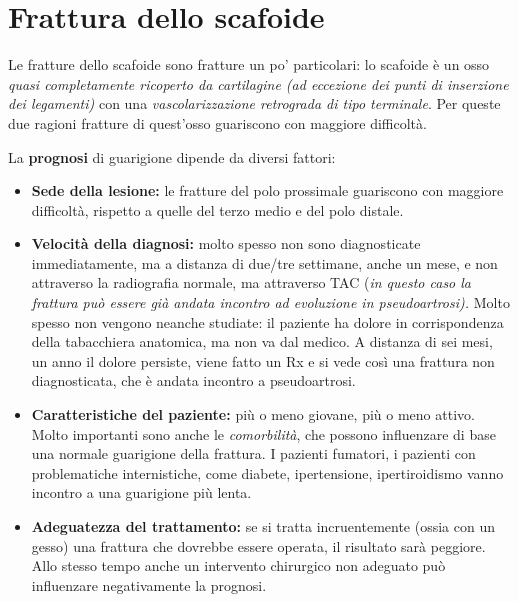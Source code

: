 \section{Frattura dello scafoide}

Le fratture dello scafoide sono fratture un po' particolari: lo scafoide è un osso \emph{quasi completamente ricoperto da cartilagine (ad eccezione dei punti di inserzione dei legamenti)} con una
\emph{vascolarizzazione retrograda di tipo terminale}. Per queste due ragioni fratture di quest'osso guariscono con maggiore difficoltà.

La \textbf{prognosi} di guarigione dipende da diversi fattori:

\begin{itemize}
\item
  \textbf{Sede della lesione:} le fratture del polo prossimale guariscono con maggiore difficoltà, rispetto a quelle del terzo medio e del polo distale.
\item
  \textbf{Velocità della diagnosi:} molto spesso non sono diagnosticate immediatamente, ma a distanza di due/tre settimane, anche un mese, e non attraverso la radiografia normale, ma attraverso TAC (\emph{in questo caso la frattura può essere già andata incontro ad evoluzione in pseudoartrosi).}
Molto spesso non vengono neanche studiate: il paziente ha dolore in corrispondenza della tabacchiera anatomica, ma non va dal medico. A
distanza di sei mesi, un anno il dolore persiste, viene fatto un Rx e si vede così una frattura non diagnosticata, che è andata incontro a pseudoartrosi.
\item
  \textbf{Caratteristiche del paziente:} più o meno giovane, più o meno attivo.
Molto importanti sono anche le \emph{comorbilità}, che possono influenzare di base una normale guarigione della frattura.
I pazienti fumatori, i pazienti con problematiche internistiche, come diabete, ipertensione, ipertiroidismo vanno incontro a una guarigione più lenta.
\item
  \textbf{Adeguatezza del trattamento:} se si tratta incruentemente (ossia con un gesso) una frattura che dovrebbe essere operata, il risultato sarà peggiore.
Allo stesso tempo anche un intervento chirurgico non adeguato può influenzare negativamente la prognosi.
\end{itemize}

